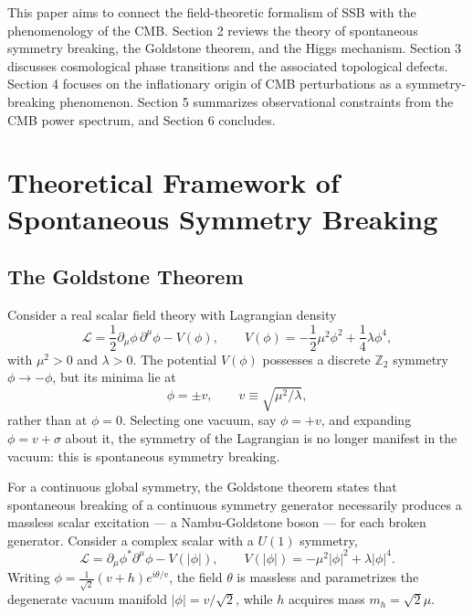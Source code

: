 \documentclass[11pt]{article}
\begin{document}
This paper aims to connect the field-theoretic formalism of SSB with the phenomenology of the CMB. Section 2 reviews the theory of spontaneous symmetry breaking, the Goldstone theorem, and the Higgs mechanism. Section 3 discusses cosmological phase transitions and the associated topological defects. Section 4 focuses on the inflationary origin of CMB perturbations as a symmetry-breaking phenomenon. Section 5 summarizes observational constraints from the CMB power spectrum, and Section 6 concludes.

\section{Theoretical Framework of Spontaneous Symmetry Breaking}

\subsection{The Goldstone Theorem}

Consider a real scalar field theory with Lagrangian density
\begin{equation}
\mathcal{L} = \frac{1}{2}\partial_\mu \phi \, \partial^\mu \phi - V(\phi),
\qquad
V(\phi) = -\frac{1}{2}\mu^2 \phi^2 + \frac{1}{4}\lambda \phi^4,
\end{equation}
with $\mu^2 > 0$ and $\lambda > 0$. The potential $V(\phi)$ possesses a discrete $\mathbb{Z}_2$ symmetry $\phi \to -\phi$, but its minima lie at
\begin{equation}
\phi = \pm v, \qquad v \equiv \sqrt{\mu^2/\lambda},
\end{equation}
rather than at $\phi = 0$. Selecting one vacuum, say $\phi = +v$, and expanding $\phi = v + \sigma$ about it, the symmetry of the Lagrangian is no longer manifest in the vacuum: this is spontaneous symmetry breaking.

For a continuous global symmetry, the Goldstone theorem \citep{Goldstone1961,Goldstone1962} states that spontaneous breaking of a continuous symmetry generator necessarily produces a massless scalar excitation --- a Nambu-Goldstone boson --- for each broken generator. Consider a complex scalar with a $U(1)$ symmetry,
\begin{equation}
\mathcal{L} = \partial_\mu \phi^* \partial^\mu \phi - V(|\phi|), \qquad V(|\phi|) = -\mu^2 |\phi|^2 + \lambda |\phi|^4.
\end{equation}
Writing $\phi = \frac{1}{\sqrt{2}}(v+h)e^{i\theta/v}$, the field $\theta$ is massless and parametrizes the degenerate vacuum manifold $|\phi| = v/\sqrt{2}$, while $h$ acquires mass $m_h = \sqrt{2}\mu$.
\end{document}
